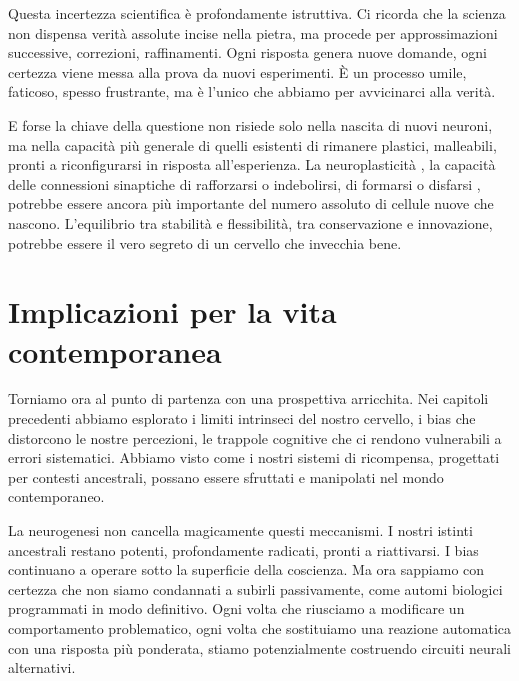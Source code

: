 Questa incertezza scientifica è profondamente istruttiva. Ci ricorda che la scienza non dispensa verità assolute incise nella pietra, ma procede per approssimazioni successive, correzioni, raffinamenti. Ogni risposta genera nuove domande, ogni certezza viene messa alla prova da nuovi esperimenti. È un processo umile, faticoso, spesso frustrante, ma è l'unico che abbiamo per avvicinarci alla verità.

E forse la chiave della questione non risiede solo nella nascita di nuovi neuroni, ma nella capacità più generale di quelli esistenti di rimanere plastici, malleabili, pronti a riconfigurarsi in risposta all'esperienza. La neuroplasticità , la capacità delle connessioni sinaptiche di rafforzarsi o indebolirsi, di formarsi o disfarsi , potrebbe essere ancora più importante del numero assoluto di cellule nuove che nascono. L'equilibrio tra stabilità e flessibilità, tra conservazione e innovazione, potrebbe essere il vero segreto di un cervello che invecchia bene.

\section{Implicazioni per la vita contemporanea}

Torniamo ora al punto di partenza con una prospettiva arricchita. Nei capitoli precedenti abbiamo esplorato i limiti intrinseci del nostro cervello, i bias che distorcono le nostre percezioni, le trappole cognitive che ci rendono vulnerabili a errori sistematici. Abbiamo visto come i nostri sistemi di ricompensa, progettati per contesti ancestrali, possano essere sfruttati e manipolati nel mondo contemporaneo.

La neurogenesi non cancella magicamente questi meccanismi. I nostri istinti ancestrali restano potenti, profondamente radicati, pronti a riattivarsi. I bias continuano a operare sotto la superficie della coscienza. Ma ora sappiamo con certezza che non siamo condannati a subirli passivamente, come automi biologici programmati in modo definitivo. Ogni volta che riusciamo a modificare un comportamento problematico, ogni volta che sostituiamo una reazione automatica con una risposta più ponderata, stiamo potenzialmente costruendo circuiti neurali alternativi.

\begin{center}  
  \label{fig:plasticita_vita}  
\end{center}

